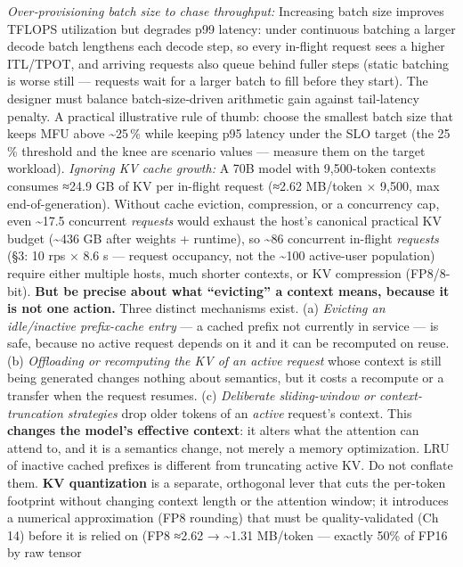\emph{Over‑provisioning batch size to chase throughput:} Increasing
batch size improves TFLOPS utilization but degrades p99 latency: under
continuous batching a larger decode batch lengthens each decode step, so
every in-flight request sees a higher ITL/TPOT, and arriving requests
also queue behind fuller steps (static batching is worse still ---
requests wait for a larger batch to fill before they start). The
designer must balance batch‑size‑driven arithmetic gain against
tail‑latency penalty. A practical illustrative rule of thumb: choose the
smallest batch size that keeps MFU above \textasciitilde25\,\% while
keeping p95 latency under the SLO target (the 25\,\% threshold and the
knee are scenario values --- measure them on the target workload).
\emph{Ignoring KV cache growth:} A 70B model with 9,500‑token contexts
consumes ≈24.9 GB of KV per in-flight request (≈2.62 MB/token × 9,500,
max end-of-generation). Without cache eviction, compression, or a
concurrency cap, even \textasciitilde17.5 concurrent \emph{requests}
would exhaust the host's canonical practical KV budget
(\textasciitilde436 GB after weights + runtime), so \textasciitilde86
concurrent in-flight \emph{requests} (§3: 10 rps × 8.6 s --- request
occupancy, not the \textasciitilde100 active-user population) require
either multiple hosts, much shorter contexts, or KV compression
(FP8/8-bit). \textbf{But be precise about what ``evicting'' a context
means, because it is not one action.} Three distinct mechanisms exist.
(a) \emph{Evicting an idle/inactive prefix-cache entry} --- a cached
prefix not currently in service --- is safe, because no active request
depends on it and it can be recomputed on reuse. (b) \emph{Offloading or
recomputing the KV of an active request} whose context is still being
generated changes nothing about semantics, but it costs a recompute or a
transfer when the request resumes. (c) \emph{Deliberate sliding-window
or context-truncation strategies} drop older tokens of an \emph{active}
request's context. This \textbf{changes the model's effective context}:
it alters what the attention can attend to, and it is a semantics
change, not merely a memory optimization. LRU of inactive cached
prefixes is different from truncating active KV. Do not conflate them.
\textbf{KV quantization} is a separate, orthogonal lever that cuts the
per-token footprint without changing context length or the attention
window; it introduces a numerical approximation (FP8 rounding) that must
be quality-validated (Ch 14) before it is relied on (FP8 ≈2.62 →
\textasciitilde1.31 MB/token --- exactly 50\% of FP16 by raw tensor
